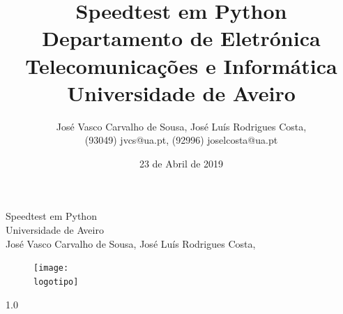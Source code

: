 \documentclass{report}
\begin{document}
%
\def\titulo{Speedtest em Python}
\def\data{23 de Abril de 2019}
\def\autores{José Vasco Carvalho de Sousa, José Luís Rodrigues Costa,}
\def\autorescontactos{(93049) jvcs@ua.pt, (92996) joselcosta@ua.pt}
\def\versao{1.0}
\def\departamento{Departamento de Eletrónica Telecomunicações e Informática}
\def\empresa{Universidade de Aveiro}
\def\logotipo{ua.pdf}
%
%
\begin{titlepage}

\begin{center}
%
\vspace*{50mm}
%
{\Huge \titulo}\\ 
%
\vspace{10mm}
%
{\Large \empresa}\\
%
\vspace{10mm}
%
{\LARGE \autores}\\ 
%
\vspace{30mm}
%
\begin{figure}[h]
\center
\texttt{[image: \\logotipo]}
\end{figure}
%
\vspace{30mm}
\end{center}
%
\begin{flushright}
\versao
\end{flushright}
\end{titlepage}

\title{%
{\Huge\textbf{\titulo}}\\
{\Large \departamento\\ \empresa}
}
%
\author{%
    \autores \\
    \autorescontactos
}
%
\date{\data}
%
\maketitle

\end{document}
